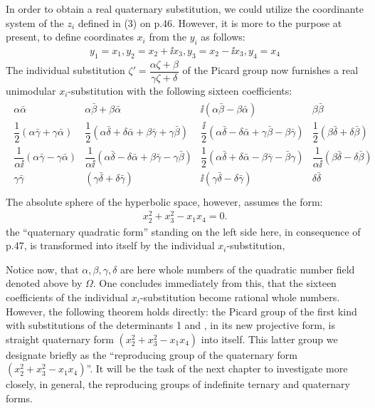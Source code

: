 In order to obtain a real quaternary substitution, we could utilize the coordinante system of the $z_i$ defined in (3) on p.46. However, it is more to the purpose at present, to define coordinates $x_i$ from the $y_i$ as follows:
\begin{align}
    y_1=x_1, y_2=x_2+\ii x_3, y_3=x_2-\ii x_3, y_4=x_4   
\end{align}
The individual substitution $\zeta'=\dfrac{\alpha\zeta+\beta}{\gamma\zeta+\delta}$ of the Picard group now furnishes a real unimodular $x_i$-substitution with the following sixteen coefficients:
\begin{align}
    \begin{array}{cccc}
    \alpha\bar{\alpha}&\alpha\bar{\beta}+\beta\bar{\alpha}&\ii(\alpha\bar{\beta}-\beta\bar{\alpha})&\beta\bar{\beta}\\
    \dfrac{1}{2}(\alpha\bar{\gamma}+\gamma\bar{\alpha})&\dfrac{1}{2}(\alpha\bar{\delta}+\delta\bar{\alpha}+\beta\bar{\gamma}+\gamma\bar{\beta})&\dfrac{\ii}{2}(\alpha\bar{\delta}-\delta\bar{\alpha}+\gamma\bar{\beta}-\beta\bar{\gamma})&\dfrac{1}{2}(\beta\bar{\delta}+\delta\bar{\beta})\\
    \dfrac{1}{\alpha\ii}(\alpha\bar{\gamma}-\gamma\bar{\alpha})&\dfrac{1}{\alpha\ii}(\alpha\bar{\delta}-\delta\bar{\alpha}+\beta\bar{\gamma}-\gamma\bar{\beta})&\dfrac{1}{2}(\alpha\bar{\delta}+\delta\bar{\alpha}-\beta\bar{\gamma}-\bar{\beta}\gamma)&\dfrac{1}{\alpha\ii}(\beta\bar{\delta}-\delta\bar{\beta})\\
    \gamma\bar{\gamma}&(\gamma\bar{\delta}+\delta\bar{\gamma})&\ii(\gamma\bar{\delta}-\delta\bar{\gamma})&\delta\bar{\delta}\\   
    \end{array}
\end{align}
The absolute sphere of the hyperbolic space, however, assumes the form:
\begin{align}
    x_2^2+x_3^2-x_1x_4=0.
\end{align}
the “quaternary quadratic form” standing on the left side here, in consequence of p.47, is transformed into itself by the individual $x_i$-substitution,

Notice now, that $\alpha,\beta,\gamma,\delta$ are here whole numbers of the quadratic number field denoted above by $\Omega$. One concludes immediately from this, that the sixteen coefficients of the individual $x_i$-substitution become rational whole numbers. However, the following theorem holds directly: the Picard group of the first kind with substitutions of the determinants 1 and \ii, in its new projective form, is straight quaternary form $(x_2^2+x_3^2-x_1x_4)$ into itself. This latter group we designate briefly as the “reproducing group of the quaternary form $(x_2^2+x_3^2-x_1x_4)$”. It will be the task of the next chapter to investigate more closely, in general, the reproducing groups of indefinite ternary and quaternary forms.

